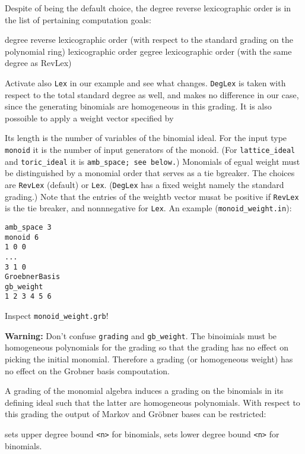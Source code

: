 Despite of being the default choice, the degree reverse lexicographic order is in the list of pertaining computation goals:
\begin{itemize}
	\itemtt[RevLex] degree reverse lexicographic order (with respect to the standard grading on the polynomial ring)
	\itemtt[Lex] lexicographic order
	\itemtt[DegLex] gegree lexicographic order (with the same degree as RevLex)
\end{itemize}
Activate also \verb|Lex| in our example and see what changes. \verb|DegLex| is taken with respect to the total standard degree as well, and makes no difference in our case, since the generating binomials are homogeneous in this grading. It is also possoible to apply a weight vector specified by 
\begin{itemize}
	\itemtt[gb\_weight]
\end{itemize}
Its length is the number of variables of the binomial ideal. For the input type \verb|monoid| it is the number of input generators of the monoid. (For \verb|lattice_ideal| and  \verb|toric_ideal| it is \verb|amb_space; see below.|) Monomials of egual weight must be distinguished by a monomial order that serves as a tie bgreaker. The choices are \verb|RevLex| (default) or \verb|Lex|. (\verb|DegLex| has a fixed weight namely the standard grading.) Note that the entries of the weightb vector musat be positive if \verb|RevLex| is the tie breaker, and nonnnegative for \verb|Lex|. An example (\verb|monoid_weight.in|):
\begin{Verbatim}
amb_space 3
monoid 6
1 0 0
...
3 1 0
GroebnerBasis
gb_weight
1 2 3 4 5 6
\end{Verbatim}
Inspect \verb|monoid_weight.grb|!

\textbf{Warning:} \enspace Don't confuse \verb|grading| and \verb|gb_weight|. The binoimials must be homogeneous polynomials for the grading so that the grading has no effect on picking the initial monomial. Therefore a grading (or homogeneous weight) has no effect on the Grobner basis compoutation.

A grading of the monomial algebra induces a grading on the binomials in its defining ideal such that the latter are homogeneous polynomials. With respect to this grading  the output of Markov and Gröbner bases can be restricted:
\begin{itemize}
	 sets upper degree bound \verb|<n>| for binomials,
	 sets lower degree bound  \verb|<n>| for binomials. 
\end{itemize}

